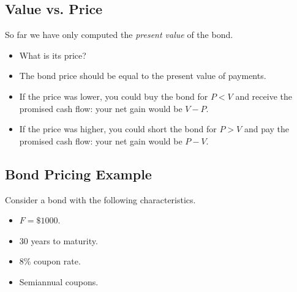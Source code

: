 \documentclass[letterpaper,10pt,english]{sphinxmanual}
\begin{document}
\subsection{Value vs. Price}
\label{bondPrices:value-vs-price}
So far we have only computed the \emph{present value} of the bond.
\begin{itemize}
\item {} 
What is its price?

\end{itemize}
\begin{itemize}
\item {} 
The bond price should be equal to the present value of payments.

\end{itemize}
\begin{itemize}
\item {} 
If the price was lower, you could buy the bond for $P < V$ and
receive the promised cash flow: your net gain would be $V -
P$.

\end{itemize}
\begin{itemize}
\item {} 
If the price was higher, you could short the bond for $P > V$
and pay the promised cash flow: your net gain would be $P -
V$.

\end{itemize}


\subsection{Bond Pricing Example}
\label{bondPrices:bond-pricing-example}
Consider a bond with the following characteristics.
\begin{itemize}
\item {} 
$F = \$1000$.

\end{itemize}
\begin{itemize}
\item {} 
30 years to maturity.

\end{itemize}
\begin{itemize}
\item {} 
8\% coupon rate.

\end{itemize}
\begin{itemize}
\item {} 
Semiannual coupons.

\end{itemize}
\end{document}
